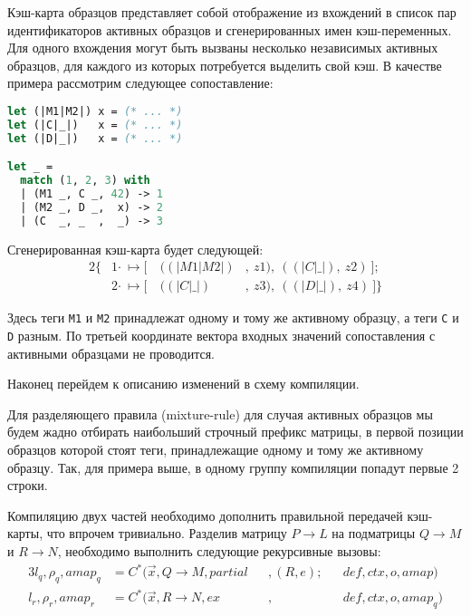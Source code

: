 Кэш-карта образцов представляет собой отображение из вхождений в список пар идентификаторов активных образцов и сгенерированных имен кэш-переменных. Для одного вхождения могут быть вызваны несколько независимых активных образцов, для каждого из которых потребуется выделить свой кэш. В качестве примера рассмотрим следующее сопоставление:

\noindent
\begin{minipage}{\linewidth}
\begin{lstlisting}[language=OCaml,escapechar=@] 
let (|M1|M2|) x = (* ... *)
let (|C|_|)   x = (* ... *) 
let (|D|_|)   x = (* ... *) 

let _ =
  match (1, 2, 3) with
  | (M1 _, C _, 42) -> 1
  | (M2 _, D _,  x) -> 2
  | (C  _, _  ,  _) -> 3
\end{lstlisting}
\end{minipage}

Сгенерированная кэш-карта будет следующей:
\begin{alignat*}{2}
\{ &1 \boldsymbol{\cdot}\ \mapsto [\ &((|M1|M2|)&,\ z1),\ ((|C|\_|),\ z2)\ ];\\ 
   &2 \boldsymbol{\cdot}\ \mapsto [\ &((|C|\_|)&,\ z3),\ ((|D|\_|),\ z4)\ ] \}
\end{alignat*}

Здесь теги \lstinline|M1| и \lstinline|M2| принадлежат одному и тому же активному образцу, а теги \lstinline|C| и \lstinline|D| разным. По третьей координате вектора входных значений сопоставления с активными образцами не проводится.

Наконец перейдем к описанию изменений в схему компиляции.

Для разделяющего правила (mixture-rule) для случая активных образцов мы будем жадно отбирать наибольший строчный префикс матрицы, в первой позиции образцов которой стоят теги, принадлежащие одному и тому же активному образцу. Так, для примера выше, в одному группу компиляции попадут первые 2 строки.

Компиляцию двух частей необходимо дополнить правильной передачей кэш-карты, что впрочем тривиально. Разделив матрицу $P \to L$ на подматрицы $Q \to M$ и $R \to N$, необходимо выполнить следующие рекурсивные вызовы:
\begin{alignat*}{3}
l_q, \rho_q, amap_q &= C^*(\vec{x}, Q \to M, partial &&, (R, e); &&def, ctx, o, amap) \\
l_r, \rho_r, amap_r &= C^*(\vec{x}, R \to N, ex &&, &&def, ctx, o, amap_q)
\end{alignat*}

